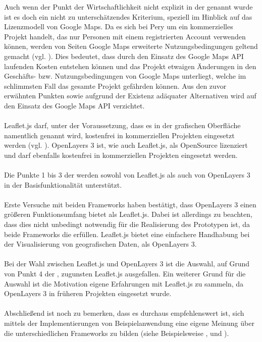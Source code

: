 \documentclass[../Bachelorarbeit.tex]{subfiles}
\begin{document}
Auch wenn der Punkt der Wirtschaftlichkeit nicht explizit in der  genannt wurde ist es doch ein nicht zu unterschätzendes Kriterium, speziell im Hinblick auf das Lizenzmodell von Google Maps.
Da es sich bei Pery um ein kommerzielles Projekt handelt, das nur Personen mit einem registrierten Account verwenden können, werden von Seiten Google Maps erweiterte Nutzungsbedingungen geltend gemacht (vgl. \cite[Abschnitt: Can I use the Google Maps APIs on a site that is password protected?]{GoogleMapsApiUsage}). 
Dies bedeutet, dass durch den Einsatz des Google Maps API laufenden Kosten entstehen können und das Projekt etwaigen Änderungen in den Geschäfts- bzw. Nutzungsbedingungen von Google Maps unterliegt, welche im schlimmsten Fall das gesamte Projekt gefährden können.
Aus den zuvor erwähnten Punkten sowie aufgrund der Existenz adäquater Alternativen wird auf den Einsatz des Google Maps API verzichtet.\\
\\
Leaflet.js darf, unter der Voraussetzung, dass es in der grafischen Oberfläche namentlich genannt wird, kostenfrei in kommerziellen Projekten eingesetzt werden (vgl. \cite[Abschnitt: Commercial Use and Licensing]{LeafletLicense}).
OpenLayers 3 ist, wie auch Leaflet.js, als OpenSource lizenziert und darf ebenfalls kostenfrei in kommerziellen Projekten eingesetzt werden.\\
\\
Die Punkte 1 bis 3 der  werden sowohl von Leaflet.js als auch von OpenLayers 3 in der Basisfunktionalität unterstützt.\\
\\
Erste Versuche mit beiden Frameworks haben bestätigt, dass OpenLayers 3 einen größeren Funktionsumfang bietet als Leaflet.js. 
Dabei ist allerdings zu beachten, dass dies nicht unbedingt notwendig für die Realisierung des Prototypen ist, da beide Frameworks die  erfüllen. 
Leaflet.js bietet eine einfachere Handhabung bei der Visualisierung von geografischen Daten, als OpenLayers 3.\\
\\
Bei der Wahl zwischen Leaflet.js und OpenLayers 3 ist die Auswahl, auf Grund von Punkt 4 der , zugunsten Leaflet.js ausgefallen. 
Ein weiterer Grund für die Auswahl ist die Motivation eigene Erfahrungen mit Leaflet.js zu sammeln, da OpenLayers 3 in früheren Projekten eingesetzt wurde.\\
\\
Abschließend ist noch zu bemerken, dass es durchaus empfehlenswert ist, sich mittels der Implementierungen von Beispielanwendung eine eigene Meinung über die unterschiedlichen Frameworks zu bilden (siehe Beispielsweise \cite{OpenlayersExamples}, \cite{LeafletTutorials} und \cite{GoogleMapsExamples}).
\end{document}
